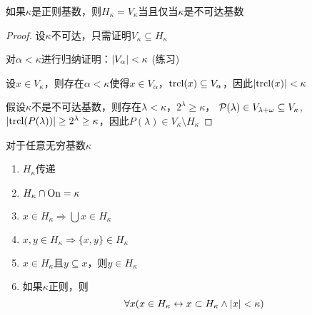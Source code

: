 \documentclass[11pt]{article}
\begin{document}
\begin{lemma}[]
如果\(\kappa\)是正则基数，则\(H_\kappa=V_\kappa\)当且仅当\(\kappa\)是不可达基数
\end{lemma}

\begin{proof}
设\(\kappa\)不可达，只需证明\(V_\kappa\subseteq H_\kappa\)

对\(\alpha<\kappa\)进行归纳证明：\(\abs{V_\alpha}<\kappa\) (练习)

设\(x\in V_\kappa\)，则存在\(\alpha<\kappa\)使得\(x\in V_\alpha\)，\(\operatorname{\text{trcl}}(x)\subseteq V_\alpha\)，因此\(\abs{\trcl(x)}<\kappa\)

假设\(\kappa\)不是不可达基数，则存在\(\lambda<\kappa\)，\(2^\lambda\ge\kappa\)，
\(\mathcal{P}(\lambda)\in V_{\lambda+\omega}\subseteq V_\kappa\),\(\abs{\trcl(P(\lambda))}\ge 2^\lambda\ge\kappa\)，因此\(P(\lambda)\in V_\kappa\setminus H_\kappa\)
\end{proof}

\begin{lemma}[]
对于任意无穷基数\(\kappa\)
\begin{enumerate}
\item \(H_\kappa\)传递
\item \(H_\kappa\cap\operatorname{On}=\kappa\)
\item \(x\in H_\kappa\Rightarrow\bigcup x\in H_\kappa\)
\item \(x,y\in H_\kappa\Rightarrow\{x,y\}\in H_\kappa\)
\item \(x\in H_\kappa\)且\(y\subseteq x\)，则\(y\in H_\kappa\)
\item 如果\(\kappa\)正则，则
\begin{equation*}
\forall x(x\in H_\kappa\leftrightarrow x\subset H_\kappa\wedge\abs{x}<\kappa)
\end{equation*}
\end{enumerate}
\end{lemma}
\end{document}
